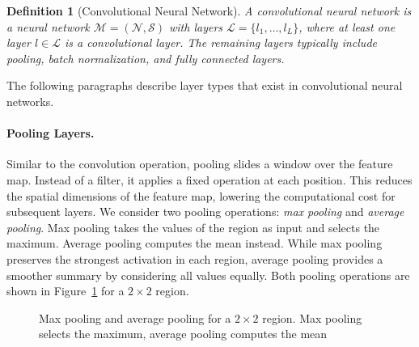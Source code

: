 \documentclass[
12pt,
fancyheadings,
a4paper,
twoside,
BCOR=0.7cm,
nobcorignoretitle,
grayscalebody,
]{stsreprt}
\newtheorem{definition}{Definition}[chapter]
\begin{document}
\begin{definition}[Convolutional Neural Network]
\label{def:cnn}
A convolutional neural network is a neural network $\mathcal{M} = (\mathcal{N}, \mathcal{S})$ with
layers $\mathcal{L} = \{l_1, \dots, l_L\}$, where at least one layer $l \in \mathcal{L}$ is a
convolutional layer.
The remaining layers typically include pooling, batch normalization, and fully connected layers.
\end{definition}

The following paragraphs describe layer types that exist in convolutional neural networks.

\paragraph{Pooling Layers.}
Similar to the convolution operation, pooling slides a window over the feature map.
Instead of a filter, it applies a fixed operation at each position.
This reduces the spatial dimensions of the feature map, lowering the computational cost for
subsequent layers.
We consider two pooling operations: \textit{max pooling} and \textit{average pooling}.
Max pooling takes the values of the region as input and selects the maximum.
Average pooling computes the mean instead.
While max pooling preserves the strongest activation in each region, average pooling provides a
smoother summary by considering all values equally.
Both pooling operations are shown in Figure~\ref{fig:pooling} for a $2 \times 2$ region.

\begin{figure}[ht!]
    \centering
    \caption{Max pooling and average pooling for a $2 \times 2$ region. Max pooling selects the maximum, average pooling computes the mean}
    \label{fig:pooling}
\end{figure}
\end{document}

